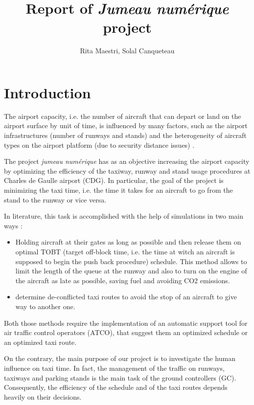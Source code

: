 \documentclass{article}
\begin{document}
	
	\title{Report of \textit{Jumeau numérique} project}
	\author{Rita Maestri, Solal Canqueteau}
	\maketitle
	
\newpage

\tableofcontents
\newpage

	
\part{Introduction}

The airport capacity, i.e. the number of aircraft that can depart or land on the airport surface by unit of time, is influenced by many factors, such as the airport infrastructures (number of runways and stands) and the heterogeneity of aircraft types on the airport platform (due to security distance issues) \cite{gotteland}.

The project \textit{jumeau numérique} has as an objective increasing the airport capacity by optimizing the efficiency of the taxiway, runway and stand usage procedures at Charles de Gaulle airport (CDG). In particular, the goal of the project is minimizing the taxi time, i.e. the time it takes for an aircraft to go from the stand to the runway or vice versa.

In literature, this task is accomplished with the help of simulations in two main ways \cite{rathinam}:

\begin{itemize}
	\item Holding aircraft at their gates as
	long as possible and then release them on optimal TOBT (target off-block time, i.e. the time at witch an aircraft is supposed to begin the push back procedure)
	schedule. This method allows to limit the length of the queue at the runway and also to turn on the engine of the aircraft as late as possible, saving fuel and avoiding CO2 emissions.

	\item determine de-conflicted taxi routes to avoid the stop of an aircraft to give way to another one.
\end{itemize}

Both those methods require the implementation of an automatic support tool for air traffic control operators (ATCO), that suggest them an optimized schedule or an optimized taxi route.


On the contrary, the main purpose of our project is to investigate the human influence on taxi time.
In fact, the management of the traffic on runways, taxiways and parking stands is the main task of the ground controllers (GC). Consequently, the efficiency of the schedule and of the taxi routes depends heavily on their decisions.
\end{document}

